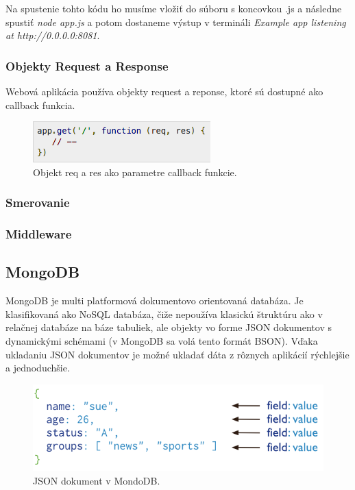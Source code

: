 Na spustenie tohto kódu ho musíme vložiť do súboru s koncovkou .js a následne spustiť \textit{node app.js} a potom dostaneme výstup v termináli \textit{Example app listening at http://0.0.0.0:8081}.

\subsubsection{Objekty Request a Response}
Webová aplikácia používa objekty request a reponse, ktoré sú dostupné ako callback funkcia.\cite{express-tutorial}

\begin{figure}[H]
  \centering
  \includegraphics[scale=0.7]{img/express/express-req.png}
  \caption{Objekt req a res ako parametre callback funkcie.}
  \label{express-example}
\end{figure}


\subsubsection{Smerovanie}
\cite{express-tutorial}

\subsubsection{Middleware}
\cite{express-tutorial}

\subsection{MongoDB}
MongoDB je multi platformová dokumentovo orientovaná databáza. Je klasifikovaná ako NoSQL databáza, čiže nepoužíva klasickú štruktúru ako v relačnej databáze na báze tabuliek, ale objekty vo forme JSON dokumentov s dynamickými schémami (v MongoDB sa volá tento formát BSON). Vďaka ukladaniu JSON dokumentov je možné ukladať dáta z rôznych aplikácií rýchlejšie a jednoduchšie.\cite{mongodb-wiki}

\begin{figure}[H]
  \centering
  \includegraphics[scale=0.7]{img/mongodb/crud-annotated-document.png}
  \caption{JSON dokument v MondoDB.}
  \label{mongodb-example}
\end{figure}

